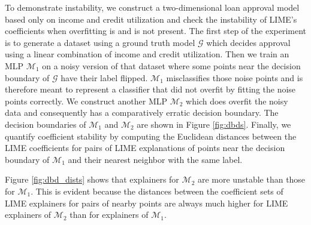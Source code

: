 \documentclass[mnsc,blindrev]{informs3}
\begin{document}
            To demonstrate instability, we construct a two-dimensional loan approval model based only on income and credit utilization and check the instability of LIME's coefficients when overfitting is and is not present. %
            The first step of the experiment is to generate a dataset using a ground truth model $\mathcal{G}$ which decides approval using a linear combination of income and credit utilization. Then we train an MLP $\mathcal{M}_1$ on a noisy version of that dataset where some points near the decision boundary of $\mathcal{G}$ have their label flipped. $\mathcal{M}_1$ misclassifies those noise points and is therefore meant to represent a classifier that did not overfit by fitting the noise points correctly. We construct another MLP $\mathcal{M}_{2}$ which does overfit the noisy data and consequently has a comparatively erratic decision boundary. The decision boundaries of $\mathcal{M}_1$ and $\mathcal{M}_2$ are shown in Figure \ref{fig:dbds}. Finally, we quantify coefficient stability by computing the Euclidean distances between the LIME coefficients for pairs of LIME explanations of points near the decision boundary of $\mathcal{M}_1$ and their nearest neighbor with the same label. 

            Figure \ref{fig:dbd_dists} shows that explainers for $\mathcal{M}_{2}$ are more unstable than those for $\mathcal{M}_1$. This is evident because the distances between the coefficient sets of LIME explainers for pairs of nearby points are always much higher for LIME explainers of $\mathcal{M}_{2}$ than for explainers of $\mathcal{M}_1$.%
\end{document}
